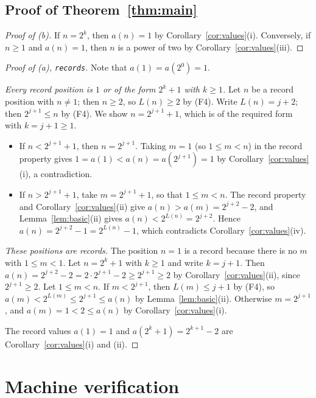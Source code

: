 \documentclass[11pt]{amsart}
\theoremstyle{plain}
\theoremstyle{definition}
\begin{document}
\subsection{Proof of Theorem~\ref{thm:main}}

\begin{proof}[Proof of (b)]
If $n=2^k$, then $a(n)=1$ by Corollary~\ref{cor:values}(i). Conversely, if $n\ge1$ and $a(n)=1$, then $n$ is a power of two by Corollary~\ref{cor:values}(iii).
\end{proof}

\begin{proof}[Proof of (a), \textup{\texttt{records}}]
Note that $a(1)=a(2^0)=1$.

\emph{Every record position is $1$ or of the form $2^k+1$ with $k\ge1$.} Let $n$ be a record position with $n\ne1$; then $n\ge2$, so $L(n)\ge2$ by (F4). Write $L(n)=j+2$; then $2^{j+1}\le n$ by (F4). We show $n=2^{j+1}+1$, which is of the required form with $k=j+1\ge1$.
\begin{itemize}
\item If $n<2^{j+1}+1$, then $n=2^{j+1}$. Taking $m=1$ (so $1\le m<n$) in the record property gives $1=a(1)<a(n)=a(2^{j+1})=1$ by Corollary~\ref{cor:values}(i), a contradiction.
\item If $n>2^{j+1}+1$, take $m=2^{j+1}+1$, so that $1\le m<n$. The record property and Corollary~\ref{cor:values}(ii) give $a(n)>a(m)=2^{j+2}-2$, and Lemma~\ref{lem:basic}(ii) gives $a(n)<2^{L(n)}=2^{j+2}$. Hence $a(n)=2^{j+2}-1=2^{L(n)}-1$, which contradicts Corollary~\ref{cor:values}(iv).
\end{itemize}

\emph{These positions are records.} The position $n=1$ is a record because there is no $m$ with $1\le m<1$. Let $n=2^k+1$ with $k\ge1$ and write $k=j+1$. Then $a(n)=2^{j+2}-2=2\cdot2^{j+1}-2\ge2^{j+1}\ge2$ by Corollary~\ref{cor:values}(ii), since $2^{j+1}\ge2$. Let $1\le m<n$. If $m<2^{j+1}$, then $L(m)\le j+1$ by (F4), so $a(m)<2^{L(m)}\le2^{j+1}\le a(n)$ by Lemma~\ref{lem:basic}(ii). Otherwise $m=2^{j+1}$, and $a(m)=1<2\le a(n)$ by Corollary~\ref{cor:values}(i).

The record values $a(1)=1$ and $a(2^k+1)=2^{k+1}-2$ are Corollary~\ref{cor:values}(i) and (ii).
\end{proof}


\section{Machine verification}\label{sec:lean}
\end{document}
